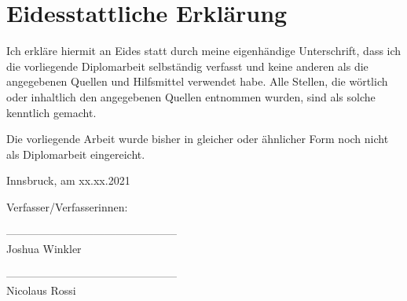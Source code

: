 \section*{Eidesstattliche Erklärung}

Ich erkläre hiermit an Eides statt durch meine eigenhändige Unterschrift, dass ich die vorliegende Diplomarbeit selbständig verfasst und keine anderen als die angegebenen Quellen und Hilfsmittel verwendet habe. Alle Stellen, die wörtlich oder inhaltlich den angegebenen Quellen entnommen wurden, sind als solche kenntlich gemacht.

Die vorliegende Arbeit wurde bisher in gleicher oder ähnlicher Form noch nicht als Diplomarbeit eingereicht.

Innsbruck, am xx.xx.2021

\vspace*{3cm}



Verfasser/Verfasserinnen:

\vspace*{2cm}


-----------------------------------------------\\
\hspace*{1.3cm}           Joshua Winkler

\vspace*{2cm}


-----------------------------------------------\\
\hspace*{1.3cm}           Nicolaus Rossi



\newpage